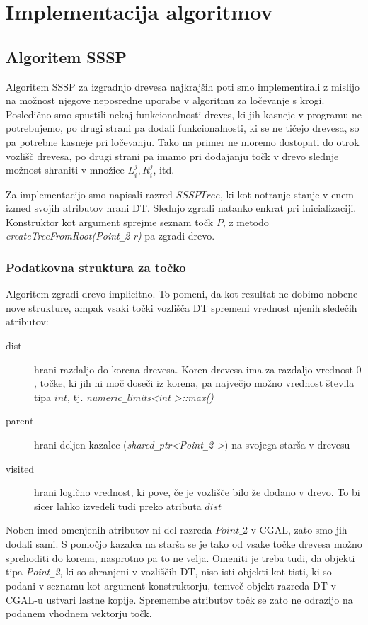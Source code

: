 \documentclass[a4paper, 12pt]{book}
\newcommand{\U}{\texttt{\_}}
\begin{document}
\chapter{Implementacija algoritmov}
\label{ch3}


\section{Algoritem SSSP}

Algoritem SSSP za izgradnjo drevesa najkrajših poti smo implementirali z mislijo na možnost njegove neposredne uporabe v algoritmu za ločevanje s krogi. Posledično smo spustili nekaj funkcionalnosti dreves, ki jih kasneje v programu ne potrebujemo, po drugi strani pa dodali funkcionalnosti, ki se ne tičejo drevesa, so pa potrebne kasneje pri ločevanju. Tako na primer ne moremo dostopati do otrok vozlišč drevesa, po drugi strani pa imamo pri dodajanju točk v drevo slednje možnost shraniti v množice $L_i^j, R_i^j$, itd.

Za implementacijo smo napisali razred $SSSPTree$, ki kot notranje stanje v enem izmed svojih atributov hrani DT. Slednjo zgradi natanko enkrat pri inicializaciji. Konstruktor kot argument sprejme seznam točk $P$, z metodo \textit{createTreeFromRoot(Point\U 2 r)} pa zgradi drevo.

\subsection{Podatkovna struktura za točko}
\label{point-refs}
Algoritem zgradi drevo implicitno. To pomeni, da kot rezultat ne dobimo nobene nove strukture, ampak vsaki točki vozlišča DT spremeni vrednost njenih sledečih atributov:

\begin{description}
\item[dist] hrani razdaljo do korena drevesa. Koren drevesa ima za razdaljo vrednost $0$, točke, ki jih ni moč doseči iz korena, pa največjo možno vrednost števila tipa $int$, tj. \textit{numeric\U limits\textless int \textgreater ::max()}
\item[parent] hrani deljen kazalec (\textit{shared\U ptr\textless Point\U 2 \textgreater}) na svojega starša v drevesu
\item[visited] hrani logično vrednost, ki pove, če je vozlišče bilo že dodano v drevo. To bi sicer lahko izvedeli tudi preko atributa $dist$
\end{description}

Noben imed omenjenih atributov ni del razreda $Point\U 2$ v CGAL, zato smo jih dodali sami. S pomočjo kazalca na starša se je tako od vsake točke drevesa možno sprehoditi do korena, nasprotno pa to ne velja. Omeniti je treba tudi, da objekti tipa \textit{Point\U 2}, ki so shranjeni v vozliščih DT, niso isti objekti kot tisti, ki so podani v seznamu kot argument konstruktorju, temveč objekt razreda DT v CGAL-u ustvari lastne kopije. Spremembe atributov točk se zato ne odrazijo na podanem vhodnem vektorju točk. 
\end{document}
